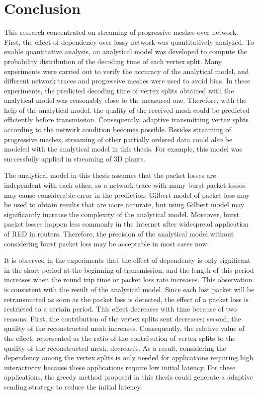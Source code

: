 \documentclass[11pt, a4paper]{report}
\begin{document}





\chapter{Conclusion}
\label{c:conclusion}
This research concentrated on streaming of progressive meshes over network. 
First, the effect of dependency over lossy network was quantitatively analyzed. 
To enable quantitative analysis, an analytical model was developed to compute 
the probability distribution of the decoding time of each vertex split. 
Many experiments were carried out to verify the accuracy of the analytical model, 
and different network traces and progressive meshes were used to avoid bias. 
In these experiments, the predicted decoding time of vertex splits obtained 
with the analytical model was reasonably close to the measured one. 
Therefore, with the help of the analytical model, 
the quality of the received mesh could be predicted efficiently before transmission.
Consequently, adaptive transmitting vertex splits according to the network condition
becomes possible. Besides streaming of progressive meshes, 
streaming of other partially ordered data could also be modeled
with the analytical model in this thesis. 
For example, this model was successfully applied in streaming of 3D plants.

The analytical model in this thesis assumes that the packet losses 
are independent with each other, 
so a network trace with many burst packet losses may cause considerable error in the prediction. 
Gilbert model of packet loss may be used to obtain results that are more accurate, 
but using Gilbert model may significantly increase the complexity of the analytical model. 
Moreover, burst packet losses happen less commonly in the Internet
after widespread application of RED in routers. 
Therefore, the precision of the analytical model
without considering burst packet loss may be acceptable in most cases now.

It is observed in the experiments that the effect of dependency
is only significant in the short period at the beginning of transmission, 
and the length of this period increases
when the round trip time or packet loss rate increases. 
This observation is consistent with the result of the analytical model. 
Since each lost packet will be retransmitted as soon as the packet loss is detected, 
the effect of a packet loss is restricted to a certain period. 
This effect decreases with time because of two reasons. 
First, the contribution of the vertex splits sent decreases; 
second, the quality of the reconstructed mesh increases. 
Consequently, the relative value of the effect, 
represented as the ratio of the contribution of vertex
splits to the quality of the reconstructed mesh, decreases.
As a result, considering the dependency among the vertex splits 
is only needed for applications requiring high interactivity
because these applications require low initial latency. 
For these applications, the greedy method proposed in this thesis
could generate a adaptive sending strategy to reduce the initial latency. 
\end{document}
